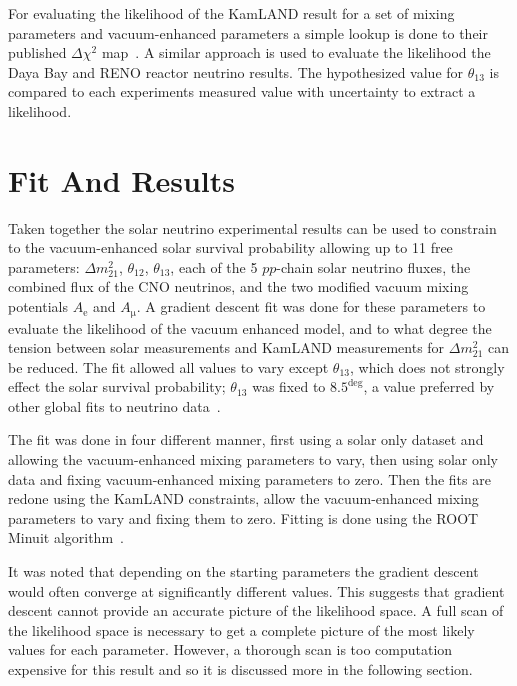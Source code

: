 For evaluating the likelihood of the KamLAND result for a set of
mixing parameters and vacuum-enhanced parameters a simple lookup
is done to their published $\Delta \chi^{2}$ map~\cite{kamland_data_release}.
A similar approach is used to evaluate the likelihood the Daya Bay and
RENO reactor neutrino results. 
The hypothesized value for $\theta_{13}$ is compared to each
experiments measured value with uncertainty to extract a likelihood.


\chapter{Fit And Results}
\label{sec:cham_results}
Taken together the solar neutrino experimental results can be used to constrain
to the  vacuum-enhanced solar survival probability allowing up to
11 free parameters: $\Delta m^{2}_{21}$, $\theta_{12}$, $\theta_{13}$,
each of the 5 $pp$-chain solar neutrino fluxes, the combined flux of the
CNO neutrinos, and the two modified vacuum mixing potentials $A_{\mathrm{e}}$
and $A_{\mathrm{\mu}}$.
A gradient descent fit was done for these parameters to evaluate the likelihood of the vacuum enhanced
model, and to what degree the tension between solar measurements and KamLAND measurements
for $\Delta m^{2}_{21}$ can be reduced.
The fit allowed all values to vary except $\theta_{13}$, which does not strongly effect
the solar survival probability; $\theta_{13}$ was fixed to $8.5^{\deg}$, a value
preferred by other global fits to neutrino data~\cite{nu_fit4}.

The fit was done in four different manner,
first using a solar only dataset and allowing the  vacuum-enhanced mixing parameters
to vary, then using solar only data and fixing vacuum-enhanced mixing parameters
to zero.
Then the fits are redone using the KamLAND constraints, allow 
the vacuum-enhanced mixing parameters to vary and fixing them to zero.
Fitting is done using the ROOT Minuit algorithm~\cite{minuit}.

It was noted that depending on the starting parameters the gradient
descent would often converge at significantly different values.
This suggests that gradient descent cannot provide an accurate
picture of the likelihood space.
A full scan of the likelihood space is necessary to
get a complete picture of the most likely values for
each parameter.
However, a thorough scan is too computation expensive for
this result and so it is discussed more in the following section.


